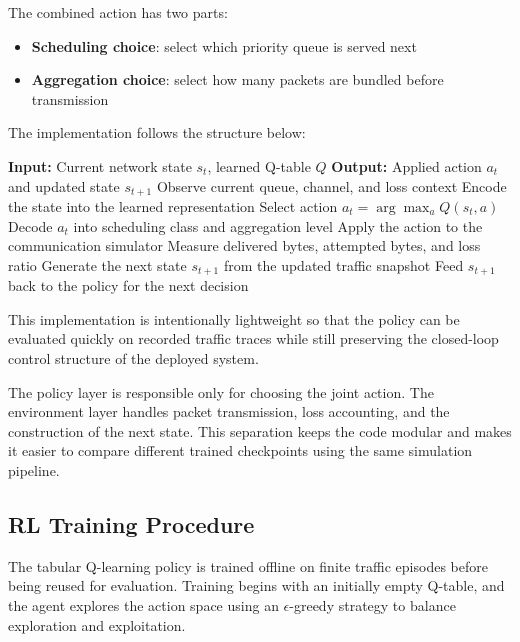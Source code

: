 The combined action has two parts:

\begin{itemize}
\item \textbf{Scheduling choice}: select which priority queue is served next
\item \textbf{Aggregation choice}: select how many packets are bundled before transmission
\end{itemize}

The implementation follows the structure below:

\begin{algorithm}[H]
\caption{Closed-Loop RL Scheduling and Aggregation Execution}
\begin{algorithmic}[1]
\State \textbf{Input:} Current network state $s_t$, learned Q-table $Q$
\State \textbf{Output:} Applied action $a_t$ and updated state $s_{t+1}$
\State Observe current queue, channel, and loss context
\State Encode the state into the learned representation
\State Select action $a_t = \arg\max_a Q(s_t, a)$
\State Decode $a_t$ into scheduling class and aggregation level
\State Apply the action to the communication simulator
\State Measure delivered bytes, attempted bytes, and loss ratio
\State Generate the next state $s_{t+1}$ from the updated traffic snapshot
\State Feed $s_{t+1}$ back to the policy for the next decision
\end{algorithmic}
\end{algorithm}

This implementation is intentionally lightweight so that the policy can 
be evaluated quickly on recorded traffic traces while still preserving the 
closed-loop control structure of the deployed system.

The policy layer is responsible only for choosing the joint action. The 
environment layer handles packet transmission, loss accounting, and the 
construction of the next state. This separation keeps the code modular and 
makes it easier to compare different trained checkpoints using the same 
simulation pipeline.

\subsection{RL Training Procedure}

The tabular Q-learning policy is trained offline on finite traffic episodes
before being reused for evaluation. Training begins with an initially empty
Q-table, and the agent explores the action space using an $\epsilon$-greedy
strategy to balance exploration and exploitation.

